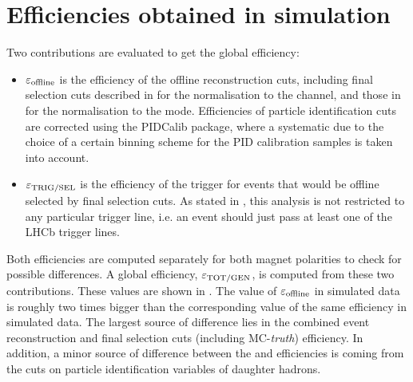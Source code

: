 \section{Efficiencies obtained in simulation}\label{app:BsJpsiKst_branching_eff}
Two contributions are evaluated to get the global efficiency:
%
\begin{itemize}
\item{} $\varepsilon_{\rm offline}$ is the efficiency of the offline reconstruction cuts, including final selection cuts described in  for the normalisation to the \BdJpsiKst channel, and those in  for the normalisation to the \BsJpsiPhi mode. Efficiencies of particle identification cuts are corrected using the PIDCalib package, where a systematic due to the choice of a certain binning scheme for the PID calibration samples is taken into account.
%
\item{} $\varepsilon_{\rm TRIG/SEL}$ is the efficiency of the trigger for events that would be offline selected by final selection cuts. As stated in , this analysis is not restricted to any particular trigger line, i.e. an event should just pass at least one of the LHCb trigger lines. 
\end{itemize}
%
Both efficiencies are computed separately for both magnet polarities to check for possible differences. A global efficiency, $\varepsilon_{\rm TOT/GEN}$, is computed from these two contributions. These values are shown in . The value of $\varepsilon_{\rm offline}$ in \BsJphi simulated data is roughly two times bigger than the corresponding value of the same efficiency in \BsJpsiKst simulated data. The largest source of difference lies in the combined event reconstruction and final selection cuts (including MC-{\it truth}) efficiency. In addition, a minor source of difference between the \BsJpsiKst and \BsJphi efficiencies is coming from the cuts on particle identification variables of daughter hadrons. 
%
